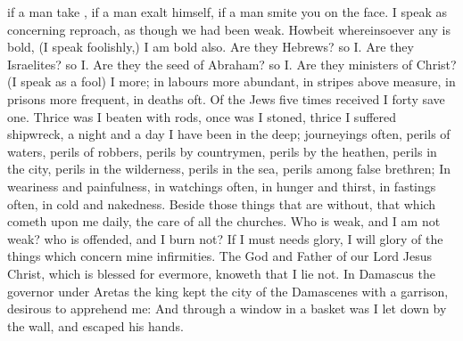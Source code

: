 {if a
man
take
{},
if a
man exalt
himself,
if a
man
smite
you
on the
face.
I
speak as
concerning
reproach,
as
though
we had been
weak.
Howbeit
whereinsoever
any is
bold, (I
speak
foolishly,)
I am
bold
also.
Are
they
Hebrews?
so
{}
I. Are
they
Israelites?
so
{}
I. Are
they the
seed of
Abraham?
so
{}
I.
Are
they
ministers of
Christ? (I
speak as a
fool)
I
{}
more;
in
labours more
abundant,
in
stripes above
measure,
in
prisons more
frequent,
in
deaths
oft.
Of the
Jews five
times received
I
forty
{}
save
one.
Thrice was I beaten with
rods,
once was I
stoned,
thrice I suffered
shipwreck, a night and a
day I have
been
in the
deep;
journeyings
often,
{}
perils of
waters,
{}
perils of
robbers,
{}
perils
by
{}
countrymen,
{}
perils
by the
heathen,
{}
perils
in the
city,
{}
perils
in the
wilderness,
{}
perils
in the
sea,
{}
perils
among false
brethren;
In
weariness
and
painfulness,
in
watchings
often,
in
hunger
and
thirst,
in
fastings
often,
in
cold
and
nakedness.
Beside those things that are
without, that which
cometh upon
me
daily, the
care of
all the
churches.
Who is
weak,
and I
am
not
weak?
who is
offended,
and
I
burn
not?
If I must
needs
glory, I will
glory of the
things which concern
mine
infirmities.
The
God
and
Father of
our
Lord
Jesus
Christ, which
is
blessed
for
evermore,
knoweth
that I
lie
not.
In
Damascus the
governor under
Aretas the
king
kept the
city of the
Damascenes with a
garrison,
desirous to
apprehend
me:
And
through a
window
in a
basket was I let
down
by the
wall,
and
escaped
his
hands.

}
